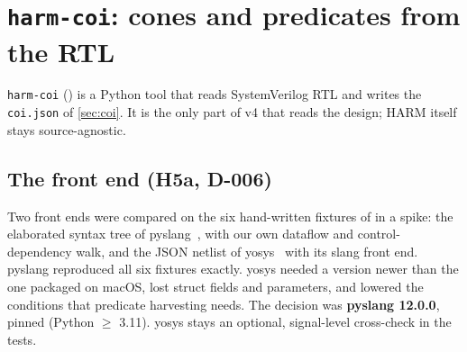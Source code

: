 \section{\texttt{harm-coi}: cones and predicates from the RTL}\label{sec:harmcoi}
\texttt{harm-coi} () is a Python tool that reads SystemVerilog RTL and writes the \texttt{coi.json} of \cref{sec:coi}. It is the only part of v4 that reads the design; HARM itself stays source-agnostic.

\subsection{The front end (H5a, D-006)}
Two front ends were compared on the six hand-written fixtures of  in a spike: the elaborated syntax tree of pyslang~\cite{slang}, with our own dataflow and control-dependency walk, and the JSON netlist of yosys~\cite{yosys} with its slang front end. pyslang reproduced all six fixtures exactly. yosys needed a version newer than the one packaged on macOS, lost struct fields and parameters, and lowered the conditions that predicate harvesting needs. The decision was \textbf{pyslang 12.0.0}, pinned (Python $\ge$ 3.11). yosys stays an optional, signal-level cross-check in the tests.

